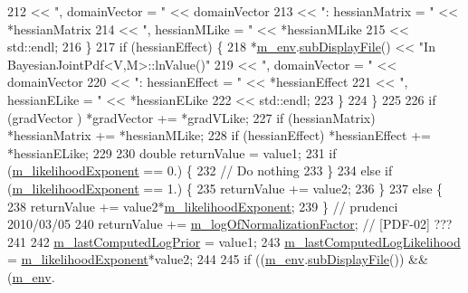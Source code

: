 \begin{DoxyCode}
212                               << \textcolor{stringliteral}{", domainVector = "}  << domainVector
213                               << \textcolor{stringliteral}{": hessianMatrix = "} << *hessianMatrix
214                               << \textcolor{stringliteral}{", hessianMLike = "}  << *hessianMLike
215                               << std::endl;
216     \}
217     \textcolor{keywordflow}{if} (hessianEffect) \{
218       *\hyperlink{class_q_u_e_s_o_1_1_base_scalar_function_adf44141aeb765d97613286f88f235f04}{m\_env}.\hyperlink{class_q_u_e_s_o_1_1_base_environment_a8a0064746ae8dddfece4229b9ad374d6}{subDisplayFile}() << \textcolor{stringliteral}{"In BayesianJointPdf<V,M>::lnValue()"}
219                               << \textcolor{stringliteral}{", domainVector = "}  << domainVector
220                               << \textcolor{stringliteral}{": hessianEffect = "} << *hessianEffect
221                               << \textcolor{stringliteral}{", hessianELike = "}  << *hessianELike
222                               << std::endl;
223     \}
224   \}
225 
226   \textcolor{keywordflow}{if} (gradVector   ) *gradVector    += *gradVLike;
227   \textcolor{keywordflow}{if} (hessianMatrix) *hessianMatrix += *hessianMLike;
228   \textcolor{keywordflow}{if} (hessianEffect) *hessianEffect += *hessianELike;
229 
230   \textcolor{keywordtype}{double} returnValue = value1;
231   \textcolor{keywordflow}{if} (\hyperlink{class_q_u_e_s_o_1_1_bayesian_joint_pdf_a511b1e403ebcab436177491ea8f21c07}{m\_likelihoodExponent} == 0.) \{
232     \textcolor{comment}{// Do nothing}
233   \}
234   \textcolor{keywordflow}{else} \textcolor{keywordflow}{if} (\hyperlink{class_q_u_e_s_o_1_1_bayesian_joint_pdf_a511b1e403ebcab436177491ea8f21c07}{m\_likelihoodExponent} == 1.) \{
235     returnValue += value2;
236   \}
237   \textcolor{keywordflow}{else} \{
238     returnValue += value2*\hyperlink{class_q_u_e_s_o_1_1_bayesian_joint_pdf_a511b1e403ebcab436177491ea8f21c07}{m\_likelihoodExponent};
239   \} \textcolor{comment}{// prudenci 2010/03/05}
240   returnValue += \hyperlink{class_q_u_e_s_o_1_1_base_joint_pdf_ae82d4191f17af8c7a26226d127bc7850}{m\_logOfNormalizationFactor}; \textcolor{comment}{// [PDF-02] ???}
241 
242   \hyperlink{class_q_u_e_s_o_1_1_bayesian_joint_pdf_a2b1c5582be60a876a6dd08766e7e31ed}{m\_lastComputedLogPrior}      = value1;
243   \hyperlink{class_q_u_e_s_o_1_1_bayesian_joint_pdf_af97f3ff0d65154366e31d14fd88ccb38}{m\_lastComputedLogLikelihood} = \hyperlink{class_q_u_e_s_o_1_1_bayesian_joint_pdf_a511b1e403ebcab436177491ea8f21c07}{m\_likelihoodExponent}*value2;
244 
245   \textcolor{keywordflow}{if} ((\hyperlink{class_q_u_e_s_o_1_1_base_scalar_function_adf44141aeb765d97613286f88f235f04}{m\_env}.\hyperlink{class_q_u_e_s_o_1_1_base_environment_a8a0064746ae8dddfece4229b9ad374d6}{subDisplayFile}()) && (\hyperlink{class_q_u_e_s_o_1_1_base_scalar_function_adf44141aeb765d97613286f88f235f04}{m\_env}.

\end{DoxyCode}
